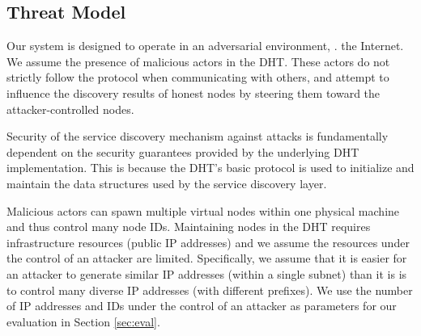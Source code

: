 \subsection{Threat Model}

Our system is designed to operate in an adversarial environment, \ie. the Internet. We assume the presence of malicious actors in the DHT. These actors do not strictly follow the protocol when communicating with others, and attempt to influence the discovery results of honest nodes by steering them toward the attacker-controlled nodes.

Security of the service discovery mechanism against attacks is fundamentally dependent on the security guarantees provided by the underlying DHT implementation. This is because the DHT's basic protocol is used to initialize and maintain the data structures used by the service discovery layer.

Malicious actors can spawn multiple virtual nodes within one physical machine and thus control many node IDs. Maintaining nodes in the DHT requires infrastructure resources (public IP addresses) and we assume the resources under the control of an attacker are limited. Specifically, we assume that it is easier for an attacker to generate similar IP addresses (within a single subnet) than it is is to control many diverse IP addresses (with different prefixes). We use the number of IP addresses and IDs under the control of an attacker as parameters for our evaluation in Section \ref{sec:eval}.


%
